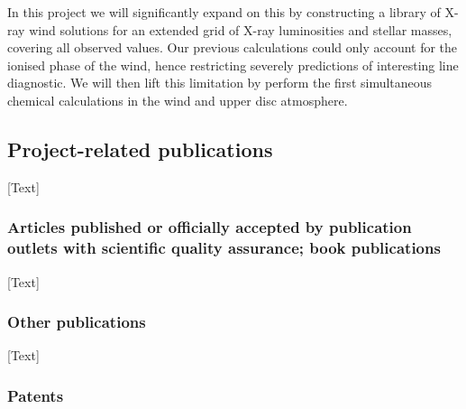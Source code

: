 \documentclass[10pt,fleqn,twoside]{article}
\newcommand{\Tcol}{\color{blue}}
\begin{document}
In this project we will
significantly expand on this by constructing a
library of X-ray wind solutions for an extended grid of
X-ray luminosities and stellar masses, covering all observed
values. 
Our previous calculations could only account for
the ionised phase of the wind, hence restricting severely predictions
of interesting line diagnostic. 
We will then lift this limitation by
perform the first simultaneous chemical calculations in
the wind and upper disc atmosphere.  


\subsection{\Tcol Project-related publications}

[Text]

\subsubsection{\Tcol 
Articles published or officially accepted by publication outlets with scientific quality assurance;
book publications}

[Text]

\subsubsection{\Tcol Other publications}

[Text]

\subsubsection{\Tcol Patents}
\end{document}
